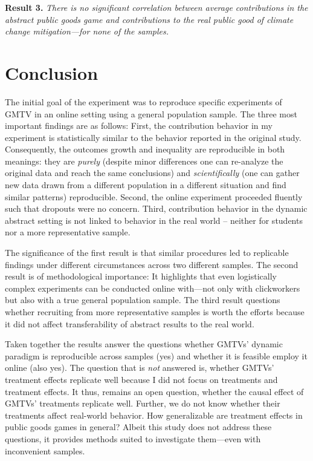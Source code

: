\documentclass[
  authoryear,
  review,
  3p,
  onecolumn]{elsarticle}
\begin{document}
\textbf{Result 3.} \emph{There is no significant correlation between
average contributions in the abstract public goods game and
contributions to the real public good of climate change mitigation---for
none of the samples.}

\hypertarget{sec-conclusion}{%
\section{Conclusion}\label{sec-conclusion}}

The initial goal of the experiment was to reproduce specific experiments
of GMTV in an online setting using a general population sample. The
three most important findings are as follows: First, the contribution
behavior in my experiment is statistically similar to the behavior
reported in the original study. Consequently, the outcomes growth and
inequality are reproducible in both meanings: they are \emph{purely}
(despite minor differences one can re-analyze the original data and
reach the same conclusions) and \emph{scientifically} (one can gather
new data drawn from a different population in a different situation and
find similar patterns) reproducible. Second, the online experiment
proceeded fluently such that dropouts were no concern. Third,
contribution behavior in the dynamic abstract setting is not linked to
behavior in the real world -- neither for students nor a more
representative sample.

The significance of the first result is that similar procedures led to
replicable findings under different circumstances across two different
samples. The second result is of methodological importance: It
highlights that even logistically complex experiments can be conducted
online with---not only with clickworkers but also with a true general
population sample. The third result questions whether recruiting from
more representative samples is worth the efforts because it did not
affect transferability of abstract results to the real world.

Taken together the results answer the questions whether GMTVs' dynamic
paradigm is reproducible across samples (yes) and whether it is feasible
employ it online (also yes). The question that is \emph{not} answered
is, whether GMTVs' treatment effects replicate well because I did not
focus on treatments and treatment effects. It thus, remains an open
question, whether the causal effect of GMTVs' treatments replicate well.
Further, we do not know whether their treatments affect real-world
behavior. How generalizable are treatment effects in public goods games
in general? Albeit this study does not address these questions, it
provides methods suited to investigate them---even with inconvenient
samples.
\end{document}
